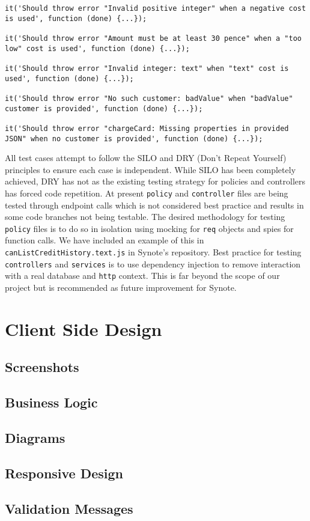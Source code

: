 \begin{lstlisting}[caption=Section Of StripeService.test.js, label={lst:stripe-test-cases}]
it('Should throw error "Invalid positive integer" when a negative cost is used', function (done) {...});

it('Should throw error "Amount must be at least 30 pence" when a "too low" cost is used', function (done) {...});

it('Should throw error "Invalid integer: text" when "text" cost is used', function (done) {...});

it('Should throw error "No such customer: badValue" when "badValue" customer is provided', function (done) {...});

it('Should throw error "chargeCard: Missing properties in provided JSON" when no customer is provided', function (done) {...});
\end{lstlisting}

All test cases attempt to follow the SILO and DRY (Don't Repeat Yourself) principles to ensure each case is independent. While SILO has been completely achieved, DRY has not as the existing testing strategy for policies and controllers has forced code repetition. At present \texttt{policy} and \texttt{controller} files are being tested through endpoint calls which is not considered best practice and results in some code branches not being testable. The desired methodology for testing \texttt{policy} files is to do so in isolation using mocking for \texttt{req} objects and spies for function calls. We have included an example of this in \texttt{canListCreditHistory.text.js} in Synote's repository. Best practice for testing \texttt{controllers} and \texttt{services} is to use dependency injection to remove interaction with a real database and \texttt{http} context. This is far beyond the scope of our project but is recommended as future improvement for Synote.\\   

\section{Client Side Design}
\label{sec:client-side-design}

\subsection{Screenshots}
\label{subsec:screenshots}

\subsection{Business Logic}
\label{subsec:business-logic}

\subsection{Diagrams}
\label{subsec:diagrams}

\subsection{Responsive Design}
\label{subsec:responsive-design}

\subsection{Validation Messages}
\label{subsec:validation-messages}
